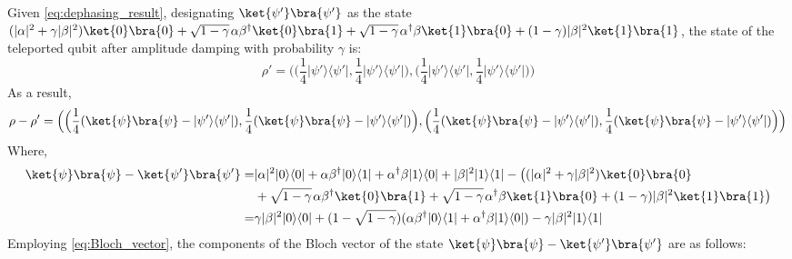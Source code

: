 Given \autoref{eq:dephasing_result}, designating $\ket{\psi'}\bra{\psi'}$ as the state $(|\alpha|^{2} + \gamma |\beta|^{2}) \ket{0}\bra{0} + \sqrt{1-\gamma} \hspace{1pt} \alpha \beta^{\dag} \ket{0}\bra{1} + \sqrt{1-\gamma} \hspace{1pt} \alpha^{\dag} \beta \ket{1}\bra{0} + (1-\gamma) |\beta|^{2} \ket{1}\bra{1}$, the state of the teleported qubit after amplitude damping with probability $\gamma$ is:
\begin{equation*}
  \rho' = \Big(\Big(\frac{1}{4} |\psi'\rangle \langle \psi'|, \frac{1}{4} |\psi'\rangle \langle \psi'|\Big),\Big(\frac{1}{4} |\psi'\rangle \langle \psi'|, \frac{1}{4}  |\psi'\rangle \langle \psi'| \Big)\Big)
\end{equation*}
As a result,
\begin{equation}
  \rho-\rho'  = \Big(\Big(\frac{1}{4} ( \ket{\psi}\bra{\psi} -|\psi'\rangle \langle \psi'|), \frac{1}{4} ( \ket{\psi}\bra{\psi} -|\psi'\rangle \langle \psi'|)\Big),\Big(\frac{1}{4} ( \ket{\psi}\bra{\psi} -|\psi'\rangle \langle \psi'|), \frac{1}{4}  ( \ket{\psi}\bra{\psi} -|\psi'\rangle \langle \psi'| )\Big)\Big)
\end{equation}
Where,
\begin{equation}
  \begin{split}
   \ket{\psi}\bra{\psi} - \ket{\psi'}\bra{\psi'}  = & |\alpha|^{2} |0\rangle \langle 0 | + \alpha \beta^{\dag} |0\rangle \langle 1 | + \alpha^{\dag} \beta |1\rangle \langle 0 | + |\beta|^{2} |1\rangle \langle 1 |  - \big((|\alpha|^{2} + \gamma |\beta|^{2}) \ket{0}\bra{0}
   \\ & + \sqrt{1-\gamma} \hspace{1pt} \alpha \beta^{\dag} \ket{0}\bra{1} + \sqrt{1-\gamma} \hspace{1pt} \alpha^{\dag} \beta \ket{1}\bra{0} + (1-\gamma) |\beta|^{2} \ket{1}\bra{1}\big)\\
   = &  \gamma |\beta|^{2} |0\rangle \langle 0 | + (1-\sqrt{1-\gamma}) (\alpha \beta^{\dag} |0\rangle \langle 1 | + \alpha^{\dag} \beta |1\rangle \langle 0 |) - \gamma |\beta|^{2} |1\rangle \langle 1 |  
  \end{split}
\end{equation}
Employing \autoref{eq:Bloch_vector}, the components of the Bloch vector of the state $\ket{\psi}\bra{\psi} - \ket{\psi'}\bra{\psi'}$ are as follows:
